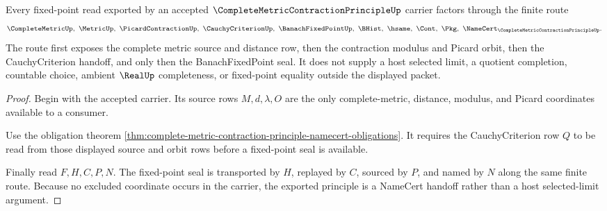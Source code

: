 \begin{theorem}
\label{thm:complete-metric-contraction-principle-picard-cauchy-route}
Every fixed-point read exported by an accepted $\CompleteMetricContractionPrincipleUp$ carrier factors through the finite route
$$
\CompleteMetricUp,\ \MetricUp,\ \PicardContractionUp,\ \CauchyCriterionUp,\ \BanachFixedPointUp,\ \BHist,\ \hsame,\ \Cont,\ \Pkg,\ \NameCert_{\CompleteMetricContractionPrincipleUp}.
$$
The route first exposes the complete metric source and distance row, then the contraction modulus and Picard orbit, then the CauchyCriterion handoff, and only then the BanachFixedPoint seal. It does not supply a host selected limit, a quotient completion, countable choice, ambient $\RealUp$ completeness, or fixed-point equality outside the displayed packet.
\end{theorem}
\begin{proof}
Begin with the accepted carrier. Its source rows $M,d,\lambda,O$ are the only complete-metric, distance, modulus, and Picard coordinates available to a consumer.

Use the obligation theorem \autoref{thm:complete-metric-contraction-principle-namecert-obligations}. It requires the CauchyCriterion row $Q$ to be read from those displayed source and orbit rows before a fixed-point seal is available.

Finally read $F,H,C,P,N$. The fixed-point seal is transported by $H$, replayed by $C$, sourced by $P$, and named by $N$ along the same finite route. Because no excluded coordinate occurs in the carrier, the exported principle is a NameCert handoff rather than a host selected-limit argument.
\end{proof}




